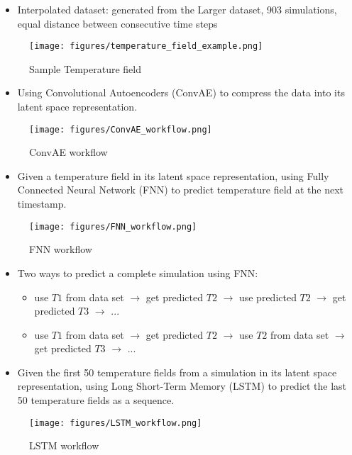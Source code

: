 {\begin{itemize}
\begin{itemize}
            \item Interpolated dataset: generated from the Larger dataset, 903 simulations, equal distance between consecutive time steps
        \end{itemize}
\end{itemize}

\begin{figure}[H]
    \centering
    \texttt{[image: figures/temperature\_field\_example.png]}
    \caption{Sample Temperature field}
\end{figure}   

\begin{itemize}   
    
    \item Using Convolutional Autoencoders (ConvAE) to compress the data into its latent space representation.
\end{itemize}

\begin{figure}[H]
    \centering
    \texttt{[image: figures/ConvAE\_workflow.png]}
    \caption{ConvAE workflow}
\end{figure}

\begin{itemize}  
    \item Given a temperature field in its latent space representation, using Fully Connected Neural Network (FNN) to predict temperature field at the next timestamp. 
\end{itemize}

\begin{figure}[H]
    \centering
    \texttt{[image: figures/FNN\_workflow.png]}
    \caption{FNN workflow}
\end{figure}

\begin{itemize} 
    \item Two ways to predict a complete simulation using FNN:

        \begin{itemize}
            \item use $T1$ from data set $\rightarrow$ get predicted $T2$ $\rightarrow$ use predicted $T2$ $\rightarrow$ get predicted $T3$ $\rightarrow$ ...
            
            \item use $T1$ from data set $\rightarrow$ get predicted $T2$ $\rightarrow$ use $T2$ from data set $\rightarrow$ get predicted $T3$ $\rightarrow$ ...
        \end{itemize}

    \item Given the first 50 temperature fields from a simulation in its latent space representation, using Long Short-Term Memory (LSTM) to predict the last 50 temperature fields as a sequence.
     
\end{itemize}

\begin{figure}[H]
    \centering
    \texttt{[image: figures/LSTM\_workflow.png]}
    \caption{LSTM workflow}
\end{figure}
}


